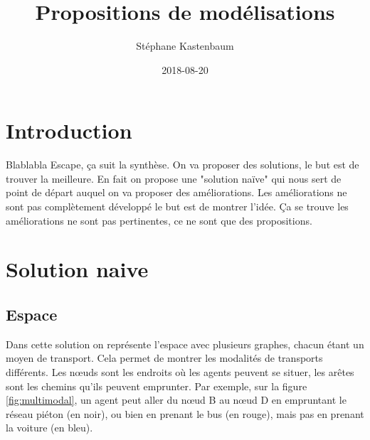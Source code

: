 \documentclass[a4paper]{article}
\title{Propositions de modélisations}
\author{Stéphane Kastenbaum}
\date{2018-08-20}
\begin{document}
\maketitle

\section{Introduction}

Blablabla Escape, ça suit la synthèse. On va proposer des solutions, le but est
de trouver la meilleure. En fait on propose une "solution naïve" qui nous sert
de point de départ auquel on va proposer des améliorations. Les améliorations ne
sont pas complètement développé le but est de montrer l'idée. Ça se trouve les
améliorations ne sont pas pertinentes, ce ne sont que des propositions.

\section{Solution naive}

  \subsection{Espace}

Dans cette solution on représente l'espace avec plusieurs graphes, chacun étant
un moyen de transport. Cela permet de montrer les modalités de transports
différents. Les nœuds sont les endroits où les agents peuvent se
situer, les arêtes sont les chemins qu'ils peuvent emprunter. Par exemple, sur
la figure \ref{fig:multimodal}, un agent peut aller du nœud B au nœud D en
empruntant le réseau piéton (en noir), ou bien en prenant le bus (en rouge),
mais pas en prenant la voiture (en bleu).
\end{document}
